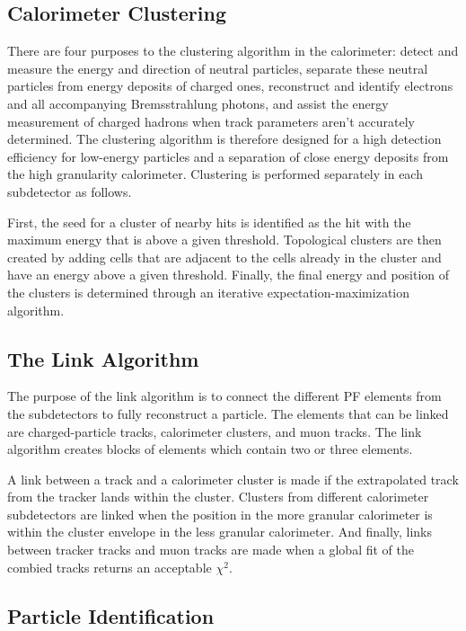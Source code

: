 \subsection{Calorimeter Clustering}

There are four purposes to the clustering algorithm in the calorimeter: detect and measure the energy and direction of neutral particles, separate these neutral particles from energy deposits of charged ones, reconstruct and identify electrons and all accompanying Bremsstrahlung photons, and assist the energy measurement of charged hadrons when track parameters aren’t accurately determined. The clustering algorithm is therefore designed for a high detection efficiency for low-energy particles and a separation of close energy deposits from the high granularity calorimeter. Clustering is performed separately in each subdetector as follows.

First, the seed for a cluster of nearby hits is identified as the hit with the maximum energy that is above a given threshold. Topological clusters are then created by adding cells that are adjacent to the cells already in the cluster and have an energy above a given threshold. Finally, the final energy and position of the clusters is determined through an iterative expectation-maximization algorithm. 

\subsection{The Link Algorithm}

The purpose of the link algorithm is to connect the different PF elements from the subdetectors to fully reconstruct a particle. The elements that can be linked are charged-particle tracks, calorimeter clusters, and muon tracks. The link algorithm creates blocks of elements which contain two or three elements. 

A link between a track and a calorimeter cluster is made if the extrapolated track from the tracker lands within the cluster. Clusters from different calorimeter subdetectors are linked when the position in the more granular calorimeter is within the cluster envelope in the less granular calorimeter. And finally, links between tracker tracks and muon tracks are made when a global fit of the combied tracks returns an acceptable $\chi^{2}$. 

\subsection{Particle Identification}

